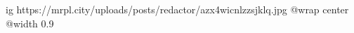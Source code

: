  
 
 
 
 

\ifcmt
  ig https://mrpl.city/uploads/posts/redactor/azx4wicnlzzsjklq.jpg
  @wrap center
  @width 0.9
\fi

